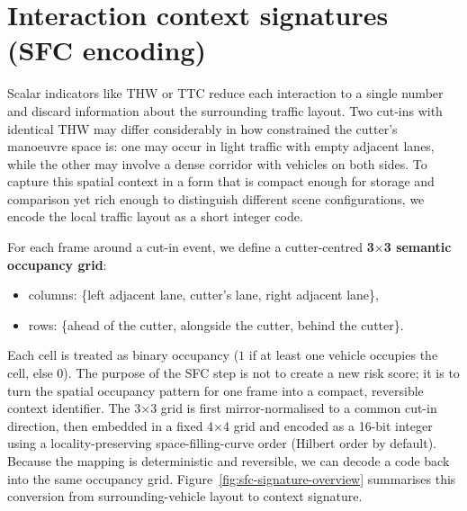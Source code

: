 \documentclass[12pt,a4paper,twoside,openright]{report}
\begin{document}
    \section{Interaction context signatures (SFC encoding)}
    Scalar indicators like THW or TTC reduce each interaction to a single number and discard information about the surrounding traffic layout. Two cut-ins with identical THW may differ considerably in how constrained the cutter's manoeuvre space is: one may occur in light traffic with empty adjacent lanes, while the other may involve a dense corridor with vehicles on both sides. To capture this spatial context in a form that is compact enough for storage and comparison yet rich enough to distinguish different scene configurations, we encode the local traffic layout as a short integer code.

    For each frame around a cut-in event, we define a cutter-centred \textbf{3$\times$3 semantic occupancy grid}:
    \begin{itemize}[leftmargin=1.2em]
  \item columns: \{left adjacent lane, cutter's lane, right adjacent lane\},
  \item rows: \{ahead of the cutter, alongside the cutter, behind the cutter\}.
    \end{itemize}

    Each cell is treated as binary occupancy ($1$ if at least one vehicle occupies the cell, else $0$). The purpose of the SFC step is not to create a new risk score; it is to turn the spatial occupancy pattern for one frame into a compact, reversible context identifier. The 3$\times$3 grid is first mirror-normalised to a common cut-in direction, then embedded in a fixed 4$\times$4 grid and encoded as a 16-bit integer using a locality-preserving space-filling-curve order (Hilbert order by default). Because the mapping is deterministic and reversible, we can decode a code back into the same occupancy grid. Figure~\ref{fig:sfc-signature-overview} summarises this conversion from surrounding-vehicle layout to context signature.
\end{document}
